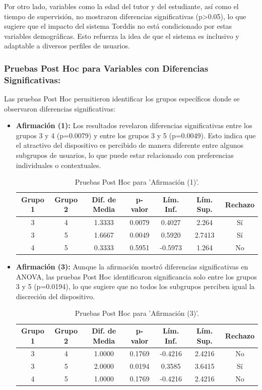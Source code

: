 Por otro lado, variables como la edad del tutor y del estudiante, así como el tiempo de supervisión, no mostraron diferencias significativas (p>0.05), lo que sugiere que el impacto del sistema Torddis no está condicionado por estas variables demográficas. Esto refuerza la idea de que el sistema es inclusivo y adaptable a diversos perfiles de usuarios.

\subsubsection{Pruebas Post Hoc para Variables con Diferencias Significativas:}
Las pruebas Post Hoc permitieron identificar los grupos específicos donde se observaron diferencias significativas:

\begin{itemize}
\item \textbf{Afirmación (1):} Los resultados revelaron diferencias significativas entre los grupos 3 y 4 (p=0.0079) y entre los grupos 3 y 5 (p=0.0049). Esto indica que el atractivo del dispositivo es percibido de manera diferente entre algunos subgrupos de usuarios, lo que puede estar relacionado con preferencias individuales o contextuales.
\begin{table}[ht]
	\centering
	\caption{Pruebas Post Hoc para 'Afirmación (1)'.}
	\begin{tabularx}{0.75\textwidth}{ccccccc}
		\hline
		\textbf{Grupo 1} & \textbf{Grupo 2} & \textbf{Dif. de Media} & \textbf{p-valor} & \textbf{Lím. Inf.} & \textbf{Lím. Sup.} & \textbf{Rechazo} \\
		\hline
		3 & 4 & 1.3333 & 0.0079 & 0.4027 & 2.264 & Sí \\
		3 & 5 & 1.6667 & 0.0049 & 0.5920 & 2.7413 & Sí \\
		4 & 5 & 0.3333 & 0.5951 & -0.5973 & 1.264 & No \\
		\hline
	\end{tabularx}
	\label{table:posthoc_1}
\end{table}
\item \textbf{Afirmación (3):} Aunque la afirmación mostró diferencias significativas en ANOVA, las pruebas Post Hoc identificaron significancia solo entre los grupos 3 y 5 (p=0.0194), lo que sugiere que no todos los subgrupos perciben igual la discreción del dispositivo.
\begin{table}[ht]
	\centering
	\caption{Pruebas Post Hoc para 'Afirmación (3)'.}
	\begin{tabularx}{0.75\textwidth}{ccccccc}
		\hline
		\textbf{Grupo 1} & \textbf{Grupo 2} & \textbf{Dif. de Media} & \textbf{p-valor} & \textbf{Lím. Inf.} & \textbf{Lím. Sup.} & \textbf{Rechazo} \\
		\hline
		3 & 4 & 1.0000 & 0.1769 & -0.4216 & 2.4216 & No \\
		3 & 5 & 2.0000 & 0.0194 & 0.3585 & 3.6415 & Sí \\
		4 & 5 & 1.0000 & 0.1769 & -0.4216 & 2.4216 & No \\
		\hline
	\end{tabularx}
	\label{table:posthoc_3}
\end{table}


\end{itemize}
